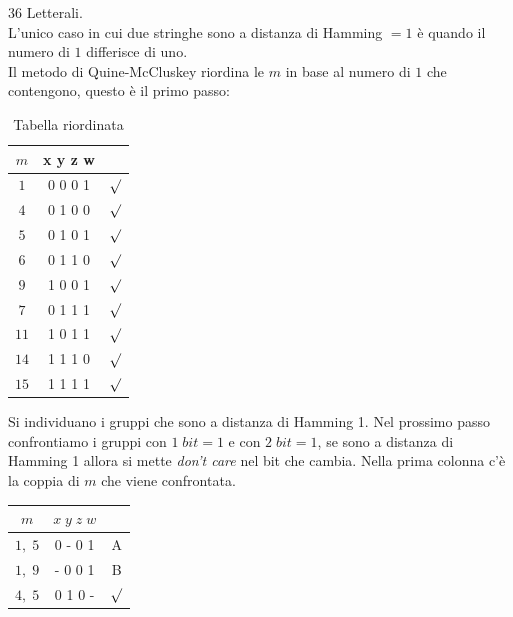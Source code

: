 \documentclass[a4paper]{article}
\theoremstyle{break}
\theoremstyle{break}
\theoremstyle{break}
\theoremstyle{break}
\begin{document}
\begin{example}
   36 Letterali.\\
   L'unico caso in cui due stringhe sono a distanza di Hamming \( =1 \) è quando il numero di \( 1 \) differisce di uno.\\
   Il metodo di Quine-McCluskey riordina le \( m \)  in base al numero di \( 1 \) che contengono,
   questo è il primo passo:
   \begin{table}[H]
       \begin{center}
           \begin{tabular}{c|c|c}
               \( m \) &  x y z w  &\\
               \hline
               \( 1 \) &  0 0 0 1&\(\surd \)\\ 
               \( 4 \) & 0 1 0 0&\(\surd \)\\
               \hline
               \( 5 \) &  0 1 0 1&\(\surd \)\\
               \( 6 \) & 0 1 1 0&\(\surd \)\\
               \( 9 \) & 1 0 0 1&\(\surd \)\\ 
               \hline
               \( 7 \) &  0 1 1 1& \(\surd \)\\
               \( 11 \) & 1 0 1 1&\(\surd \)\\
               \( 14 \) & 1 1 1 0&\(\surd \)\\
               \hline
               \( 15 \) & 1 1 1 1&\(\surd \)\\
           \end{tabular}
       \end{center}
       \caption{Tabella riordinata}
       \label{tab:quine-mccluskey2}
   \end{table}
   Si individuano i gruppi che sono a distanza di Hamming 1. Nel prossimo passo
   confrontiamo i gruppi con \( 1\;bit=1 \) e con \( 2\;bit=1 \), se sono a 
   distanza di Hamming 1 allora si mette \emph{don't care} nel bit che cambia.
   Nella prima colonna c'è la coppia di \( m \) che viene confrontata. 
   \begin{table}[H]
       \begin{center}
           \begin{tabular}{c|c|c}
               \( m \) & \( x\;y\;z\;w \)\\
               \hline
               \( 1,\; 5 \) & 0 - 0 1 & A \\ 
               \( 1,\;9 \) & - 0 0 1 & B \\
               \( 4,\;5 \) & 0 1 0 - & \(\surd \)\\

\end{tabular}
\end{center}
\end{table}
\end{example}
\end{document}
